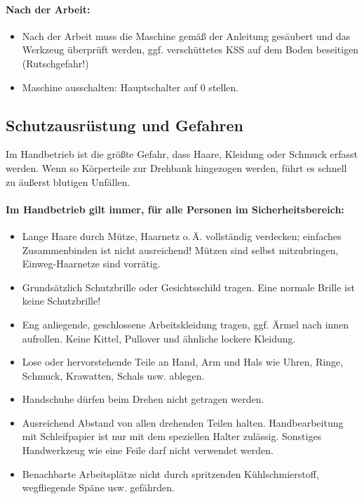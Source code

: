 \documentclass{\basedir/fablab-document}
\begin{document}
\paragraph{Nach der Arbeit:}
\begin{itemize}
 \item Nach der Arbeit muss die Maschine gemäß der Anleitung gesäubert und das Werkzeug überprüft werden, ggf. verschüttetes KSS auf dem Boden beseitigen (Rutschgefahr!)
 \item Maschine ausschalten: Hauptschalter auf 0 stellen.
\end{itemize}

\subsection{Schutzausrüstung und Gefahren}
Im Handbetrieb ist die größte Gefahr, dass Haare, Kleidung oder Schmuck erfasst werden. Wenn so Körperteile zur Drehbank hingezogen werden, führt es schnell zu äußerst blutigen Unfällen.

\paragraph{Im Handbetrieb gilt immer, für alle Personen im Sicherheitsbereich:}
\begin{itemize}
 \item Lange Haare durch Mütze, Haarnetz o.\,Ä. vollständig verdecken; einfaches Zusammenbinden ist nicht ausreichend! Mützen sind selbst mitzubringen, Einweg-Haarnetze sind vorrätig.
 \item Grundsätzlich Schutzbrille oder Gesichtsschild tragen. Eine normale Brille ist keine Schutzbrille!
 \item Eng anliegende, geschlossene Arbeitskleidung tragen, ggf. Ärmel nach innen aufrollen. Keine Kittel, Pullover und ähnliche lockere Kleidung.
 \item Lose oder hervorstehende Teile an Hand, Arm und Hals wie Uhren, Ringe, Schmuck, Krawatten, Schals usw. ablegen.
 \item Handschuhe dürfen beim Drehen nicht getragen werden.
 \item Ausreichend Abstand von allen drehenden Teilen halten. Handbearbeitung mit Schleifpapier ist nur mit dem speziellen Halter zulässig. Sonstiges Handwerkzeug wie eine Feile darf nicht verwendet werden.
 \item Benachbarte Arbeitsplätze nicht durch spritzenden Kühlschmierstoff, wegfliegende Späne usw. gefährden.
\end{itemize}
\end{document}
